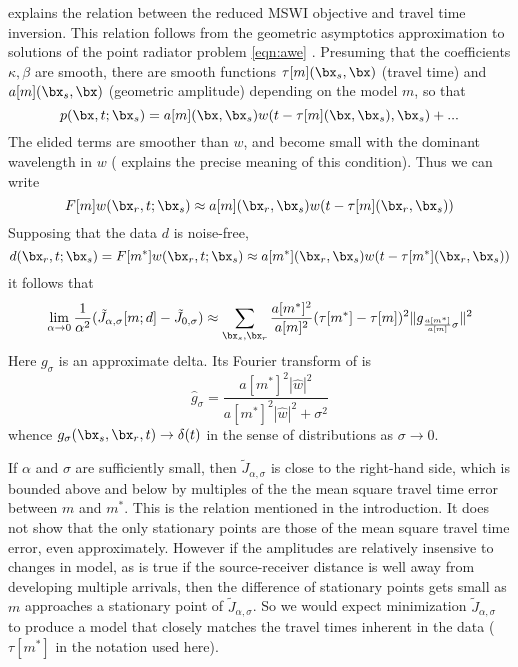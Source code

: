 \cite{Symes:24a} explains the relation between the reduced MSWI
objective and travel time inversion. This relation follows from the
geometric asymptotics approximation to solutions of the point radiator
problem \ref{eqn:awe} \cite[]{Friedlander:75}. Presuming that the
coefficients $\kappa, \beta$ are smooth, there are smooth functions
$\tau[m](\bx_s,\bx)$ (travel time) and $a[m](\bx_s,\bx)$ (geometric
amplitude) depending on the model $m$, so that
\begin{equation}
  \label{eqn:pwa}
  p(\bx,t;\bx_s) = a[m](\bx,\bx_s)w(t-\tau[m](\bx,\bx_s),\bx_s) + ...
\end{equation}
The elided terms are smoother than $w$, and become small with the
dominant wavelength in $w$ (\cite{Symes:94a} explains the precise
meaning of this condition). Thus we can write
\[
  F[m]w(\bx_r,t;\bx_s) \approx
  a[m](\bx_r,\bx_s)w(t-\tau[m](\bx_r,\bx_s))
\]
Supposing that the data $d$ is noise-free,
\[
  d(\bx_r,t;\bx_s) = F[m^*]w(\bx_r,t;\bx_s) \approx
  a[m^*](\bx_r,\bx_s)w(t-\tau[m^*](\bx_r,\bx_s))
\]
it follows that
\begin{equation}
  \label{eqn:tomo}
  \lim_{\alpha \rightarrow 0}\frac{1}{\alpha^2} (\tilde{J}_{\alpha,\sigma}[m;d]
  -\tilde{J}_{0,\sigma}) \approx \sum_{\bx_s,\bx_r} \frac{a[m^*]^2}{a[m]^2} (\tau[m^*]-\tau[m])^2\|g_{\frac{a[m^*]}{a[m]}\sigma}\|^2
\end{equation}
Here $g_{\sigma}$ is an approximate delta. Its Fourier transform of
is
\begin{equation}
  \label{eqn:gsig}
  \hat{g}_{\sigma} = \frac{a[m^*]^2 |\hat{w}|^2}{a[m^*]^2 |\hat{w}|^2
    + \sigma^2}
\end{equation}
whence $g_{\sigma}(\bx_s,\bx_r,t) \rightarrow \delta(t)$ in
the sense of distributions as $\sigma \rightarrow 0$.

If $\alpha$ and $\sigma$ are sufficiently small, then
$\tilde{J}_{\alpha,\sigma}$ is close to the right-hand side, which is bounded above and below by multiples of the the mean square travel time error between $m$ and
$m^*$.  This is the relation mentioned in the introduction. 
It does not
show that the only stationary points are those of the mean square
travel time error, even approximately. However if the amplitudes are
relatively insensive to changes in model, as is true if the
source-receiver distance is well away from developing multiple
arrivals, then the difference of stationary points gets small as $m$
approaches a stationary point of $\tilde{J}_{\alpha,\sigma}$. So we
would expect minimization $\tilde{J}_{\alpha,\sigma}$ to produce a
model that closely matches the travel times inherent in the data
($\tau[m^*]$ in the notation used here).


